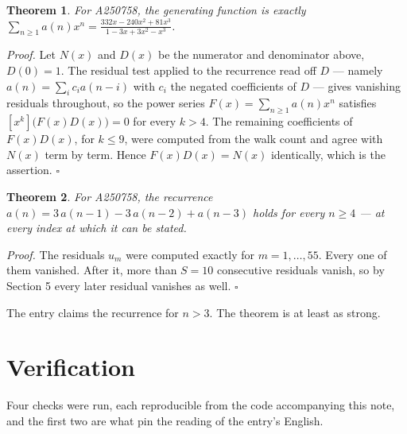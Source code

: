 \documentclass[11pt]{article}
\newtheorem{theorem}{Theorem}
\theoremstyle{definition}
\begin{document}
\begin{theorem} For A250758, the generating function is exactly $\sum_{n\ge 1} a(n)x^n = \frac{332x - 240x^{2} + 81x^{3}}{1 - 3x + 3x^{2} - x^{3}}$.\end{theorem}

{\itshape Proof.} Let $N(x)$ and $D(x)$ be the numerator and denominator above, $D(0)=1$. The residual test applied to the recurrence read off $D$ --- namely $a(n) = \sum_i c_i a(n-i)$ with $c_i$ the negated coefficients of $D$ --- gives vanishing residuals throughout, so the power series $F(x)=\sum_{n\ge 1}a(n)x^n$ satisfies $[x^k]\bigl(F(x)D(x)\bigr) = 0$ for every $k > 4$. The remaining coefficients of $F(x)D(x)$, for $k \le 9$, were computed from the walk count and agree with $N(x)$ term by term. Hence $F(x)D(x) = N(x)$ identically, which is the assertion. $\square$

\begin{theorem} For A250758, the recurrence $a(n) = 3\,a(n-1) - 3\,a(n-2) + a(n-3)$ holds for every $n \ge 4$ --- at every index at which it can be stated.\end{theorem}

{\itshape Proof.} The residuals $u_m$ were computed exactly for $m = 1,\dots,55$. Every one of them vanished. After it, more than $S = 10$ consecutive residuals vanish, so by Section 5 every later residual vanishes as well. $\square$

The entry claims the recurrence for $n > 3$. The theorem is at least as strong.

\section{Verification}

Four checks were run, each reproducible from the code accompanying this note, and the first two are what pin the reading of the entry's English.
\end{document}
